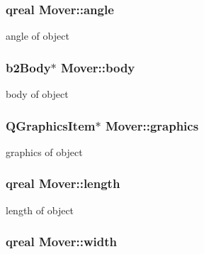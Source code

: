 \subsubsection[{\texorpdfstring{angle}{angle}}]{\setlength{\rightskip}{0pt plus 5cm}qreal Mover\+::angle}\hypertarget{class_mover_acb7d779b2ce97a86149990dce48e88b5}{}\label{class_mover_acb7d779b2ce97a86149990dce48e88b5}


angle of object 

\subsubsection[{\texorpdfstring{body}{body}}]{\setlength{\rightskip}{0pt plus 5cm}b2\+Body$\ast$ Mover\+::body}\hypertarget{class_mover_a6e91384098180f0fef918dd45f97f201}{}\label{class_mover_a6e91384098180f0fef918dd45f97f201}


body of object 

\subsubsection[{\texorpdfstring{graphics}{graphics}}]{\setlength{\rightskip}{0pt plus 5cm}Q\+Graphics\+Item$\ast$ Mover\+::graphics}\hypertarget{class_mover_a111eebc06a95c11dc6f48dcc6a33478f}{}\label{class_mover_a111eebc06a95c11dc6f48dcc6a33478f}


graphics of object 

\subsubsection[{\texorpdfstring{length}{length}}]{\setlength{\rightskip}{0pt plus 5cm}qreal Mover\+::length}\hypertarget{class_mover_a2c55f3d5a807d328bcc8c73cdef5dda2}{}\label{class_mover_a2c55f3d5a807d328bcc8c73cdef5dda2}


length of object 

\subsubsection[{\texorpdfstring{width}{width}}]{\setlength{\rightskip}{0pt plus 5cm}qreal Mover\+::width}\hypertarget{class_mover_ab78fbf587764d7cdcd417d2a444408d4}{}\label{class_mover_ab78fbf587764d7cdcd417d2a444408d4}


